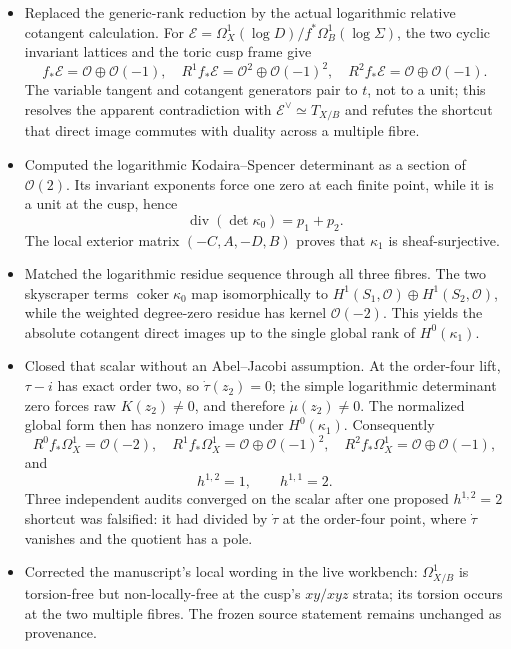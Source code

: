\begin{itemize}[leftmargin=1.8em]
\item Replaced the generic-rank reduction by the actual logarithmic relative
cotangent calculation.  For
\(
\mathcal E=\Omega_X^1(\log D)/f^*\Omega_B^1(\log\Sigma)
\), the two cyclic invariant lattices and the toric cusp frame give
\[
f_*\mathcal E=\mathcal O\oplus\mathcal O(-1),\quad
R^1f_*\mathcal E=\mathcal O^2\oplus\mathcal O(-1)^2,\quad
R^2f_*\mathcal E=\mathcal O\oplus\mathcal O(-1).
\]
The variable tangent and cotangent generators pair to $t$, not to a unit;
this resolves the apparent contradiction with
$\mathcal E^\vee\simeq T_{X/B}$ and refutes the shortcut that direct image
commutes with duality across a multiple fibre.
\item Computed the logarithmic Kodaira--Spencer determinant as a section of
$\mathcal O(2)$.  Its invariant exponents force one zero at each finite
point, while it is a unit at the cusp, hence
\[
\operatorname{div}(\det\kappa_0)=p_1+p_2.
\]
The local exterior matrix
$(-C,A,-D,B)$ proves that $\kappa_1$ is sheaf-surjective.
\item Matched the logarithmic residue sequence through all three fibres.
The two skyscraper terms $\operatorname{coker}\kappa_0$ map isomorphically
to $H^1(S_1,\mathcal O)\oplus H^1(S_2,\mathcal O)$, while the weighted
degree-zero residue has kernel $\mathcal O(-2)$.  This yields the absolute
cotangent direct images up to the single global rank of $H^0(\kappa_1)$.
\item Closed that scalar without an Abel--Jacobi assumption.  At the
order-four lift, $\tau-i$ has exact order two, so $\dot\tau(z_2)=0$; the
simple logarithmic determinant zero forces raw $K(z_2)\ne0$, and therefore
$\dot\mu(z_2)\ne0$.  The normalized global form then has nonzero image under
$H^0(\kappa_1)$.  Consequently
\[
R^0f_*\Omega_X^1=\mathcal O(-2),\quad
R^1f_*\Omega_X^1=\mathcal O\oplus\mathcal O(-1)^2,\quad
R^2f_*\Omega_X^1=\mathcal O\oplus\mathcal O(-1),
\]
and
\[
h^{1,2}=1,\qquad h^{1,1}=2.
\]
Three independent audits converged on the scalar after one proposed
$h^{1,2}=2$ shortcut was falsified: it had divided by $\dot\tau$ at the
order-four point, where $\dot\tau$ vanishes and the quotient has a pole.
\item Corrected the manuscript's local wording in the live workbench:
$\Omega^1_{X/B}$ is torsion-free but non-locally-free at the cusp's
$xy/xyz$ strata; its torsion occurs at the two multiple fibres.  The frozen
source statement remains unchanged as provenance.
\end{itemize}

